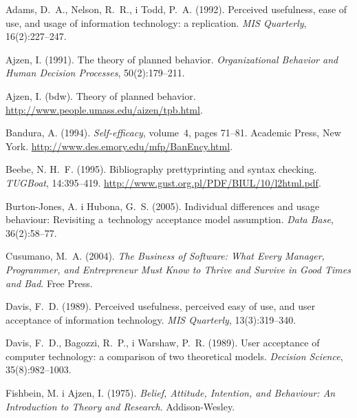 \documentclass[brudnopis,xodstep]{wkmgr}
\begin{document}
\clearpage 
{} %
\begin{thebibliography}{}
  
 Adams, D.~A.,
  Nelson, R.~R., i Todd, P.~A. (1992).  Perceived usefulness, ease of
  use, and usage of information technology: a replication.  \emph{MIS
    Quarterly}, 16(2):227--247.
  
 Ajzen, I. (1991).  The theory of
  planned behavior.  \emph{Organizational Behavior and Human Decision
    Processes}, 50(2):179--211.
  
 Ajzen, I. (bdw).  Theory of
  planned behavior.  \url{http://www.people.umass.edu/aizen/tpb.html}.
  
 Bandura, A. (1994).
  \emph{Self-efficacy}, volume~4, pages 71--81.  Academic Press, New
  York.  \url{http://www.des.emory.edu/mfp/BanEncy.html}.

Beebe, N. H.~F. (1995).
 Bibliography prettyprinting and syntax checking.
 \emph{TUGBoat}, 14:395--419.
 \url{http://www.gust.org.pl/PDF/BIUL/10/l2html.pdf}.

Burton-Jones, A. i Hubona, G.~S. (2005).
 Individual differences and usage behaviour: Revisiting a~technology
  acceptance model assumption.
 \emph{Data Base}, 36(2):58--77.

Cusumano, M.~A. (2004).
\emph{The Business of Software: What Every Manager, Programmer, and
Entrepreneur Must Know to Thrive and Survive in Good Times and Bad}.
Free Press.

Davis, F.~D. (1989).
 Perceived usefulness, perceived easy of use, and user acceptance of
  information technology.
 \emph{MIS Quarterly}, 13(3):319--340.

Davis, F.~D., Bagozzi, R.~P., i Warshaw, P.~R. (1989).
 User acceptance of computer technology: a comparison of two
  theoretical models.
 \emph{Decision Science}, 35(8):982--1003.

Fishbein, M. i Ajzen, I. (1975).
 \emph{Belief, Attitude, Intention, and Behaviour: An Introduction to
  Theory and Research}.
 Addison-Wesley.


\end{thebibliography}
\end{document}

